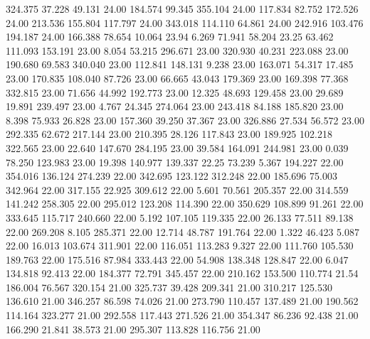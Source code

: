  324.375   37.228   49.131        24.00
 184.574   99.345  355.104        24.00
 117.834   82.752  172.526        24.00
 213.536  155.804  117.797        24.00
 343.018  114.110   64.861        24.00
 242.916  103.476  194.187        24.00
 166.388   78.654   10.064        23.94
   6.269   71.941   58.204        23.25
  63.462  111.093  153.191        23.00
   8.054   53.215  296.671        23.00
 320.930   40.231  223.088        23.00
 190.680   69.583  340.040        23.00
 112.841  148.131    9.238        23.00
 163.071   54.317   17.485        23.00
 170.835  108.040   87.726        23.00
  66.665   43.043  179.369        23.00
 169.398   77.368  332.815        23.00
  71.656   44.992  192.773        23.00
  12.325   48.693  129.458        23.00
  29.689   19.891  239.497        23.00
   4.767   24.345  274.064        23.00
 243.418   84.188  185.820        23.00
   8.398   75.933   26.828        23.00
 157.360   39.250   37.367        23.00
 326.886   27.534   56.572        23.00
 292.335   62.672  217.144        23.00
 210.395   28.126  117.843        23.00
 189.925  102.218  322.565        23.00
  22.640  147.670  284.195        23.00
  39.584  164.091  244.981        23.00
   0.039   78.250  123.983        23.00
  19.398  140.977  139.337        22.25
  73.239    5.367  194.227        22.00
 354.016  136.124  274.239        22.00
 342.695  123.122  312.248        22.00
 185.696   75.003  342.964        22.00
 317.155   22.925  309.612        22.00
   5.601   70.561  205.357        22.00
 314.559  141.242  258.305        22.00
 295.012  123.208  114.390        22.00
 350.629  108.899   91.261        22.00
 333.645  115.717  240.660        22.00
   5.192  107.105  119.335        22.00
  26.133   77.511   89.138        22.00
 269.208    8.105  285.371        22.00
  12.714   48.787  191.764        22.00
   1.322   46.423    5.087        22.00
  16.013  103.674  311.901        22.00
 116.051  113.283    9.327        22.00
 111.760  105.530  189.763        22.00
 175.516   87.984  333.443        22.00
  54.908  138.348  128.847        22.00
   6.047  134.818   92.413        22.00
 184.377   72.791  345.457        22.00
 210.162  153.500  110.774        21.54
 186.004   76.567  320.154        21.00
 325.737   39.428  209.341        21.00
 310.217  125.530  136.610        21.00
 346.257   86.598   74.026        21.00
 273.790  110.457  137.489        21.00
 190.562  114.164  323.277        21.00
 292.558  117.443  271.526        21.00
 354.347   86.236   92.438        21.00
 166.290   21.841   38.573        21.00
 295.307  113.828  116.756        21.00
